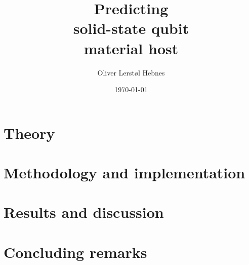 \documentclass[twoside, english, notitlepage, 12pt]{uiofysmaster}
\author{Oliver Lerstøl Hebnes}
\title{Predicting\\
solid-state qubit\\
material host
}
\date{\today}
\begin{document}
\hypersetup{pageanchor=false}
\frontmatter

    \maketitle

    \begin{abstract}
    
    \end{abstract}

    \begin{dedication}
      
    \end{dedication}

    \begin{acknowledgements}
    
    \end{acknowledgements}

    \setcounter{tocdepth}{2}
    \tableofcontents

\mainmatter

      

    \part{Theory}
        
        
        

    \part{Methodology and implementation}

        

    \part{Results and discussion}

      
      
      

    \part{Concluding remarks}
      
\end{document}
